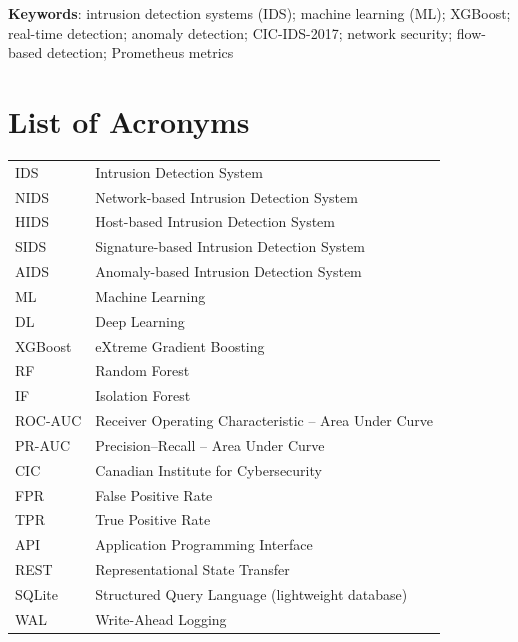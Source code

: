 \documentclass[12pt,a4paper]{article}
\begin{document}
\noindent \textbf{Keywords}: intrusion detection systems (IDS); machine learning (ML); XGBoost; real-time detection; anomaly detection; CIC-IDS-2017; network security; flow-based detection; Prometheus metrics

\tableofcontents
\newpage
\listoffigures
\newpage
\listoftables
\newpage
\renewcommand{\listalgorithmname}{List of Algorithms}
\listofalgorithms
\newpage

\section*{List of Acronyms}
\begin{longtable}{p{3cm} p{10cm}}
IDS & Intrusion Detection System \\
NIDS & Network-based Intrusion Detection System \\
HIDS & Host-based Intrusion Detection System \\
SIDS & Signature-based Intrusion Detection System \\
AIDS & Anomaly-based Intrusion Detection System \\
ML & Machine Learning \\
DL & Deep Learning \\
XGBoost & eXtreme Gradient Boosting \\
RF & Random Forest \\
IF & Isolation Forest \\
ROC-AUC & Receiver Operating Characteristic – Area Under Curve \\
PR-AUC & Precision–Recall – Area Under Curve \\
CIC & Canadian Institute for Cybersecurity \\
FPR & False Positive Rate \\
TPR & True Positive Rate \\
API & Application Programming Interface \\
REST & Representational State Transfer \\
SQLite & Structured Query Language (lightweight database) \\
WAL & Write-Ahead Logging \\
\end{longtable}

\end{document}
